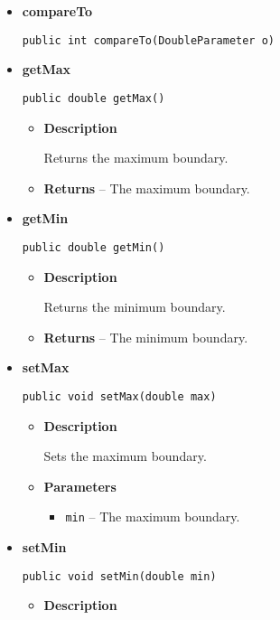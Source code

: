 {{{{{\begin{itemize}
{\begin{itemize}
{Let the visitor visit this parameter.
}
\item{
{\bf  Parameters}
  \begin{itemize}
   \item{
\texttt{visitor} -- The visitor to visit}
  \end{itemize}
}%
\end{itemize}
}%
\item{ 
{\bf  compareTo}\\
\begin{lstlisting}[frame=none]
public int compareTo(DoubleParameter o)\end{lstlisting} %
}%
\item{ 
{\bf  getMax}\\
\begin{lstlisting}[frame=none]
public double getMax()\end{lstlisting} %
\begin{itemize}
\item{
{\bf  Description}

Returns the maximum boundary.
}
\item{{\bf  Returns} -- 
The maximum boundary. 
}%
\end{itemize}
}%
\item{ 
{\bf  getMin}\\
\begin{lstlisting}[frame=none]
public double getMin()\end{lstlisting} %
\begin{itemize}
\item{
{\bf  Description}

Returns the minimum boundary.
}
\item{{\bf  Returns} -- 
The minimum boundary. 
}%
\end{itemize}
}%
\item{ 
{\bf  setMax}\\
\begin{lstlisting}[frame=none]
public void setMax(double max)\end{lstlisting} %
\begin{itemize}
\item{
{\bf  Description}

Sets the maximum boundary.
}
\item{
{\bf  Parameters}
  \begin{itemize}
   \item{
\texttt{min} -- The maximum boundary.}
  \end{itemize}
}%
\end{itemize}
}%
\item{ 
{\bf  setMin}\\
\begin{lstlisting}[frame=none]
public void setMin(double min)\end{lstlisting} %
\begin{itemize}
\item{
{\bf  Description}

}
\end{itemize}}
\end{itemize}}}}}}
